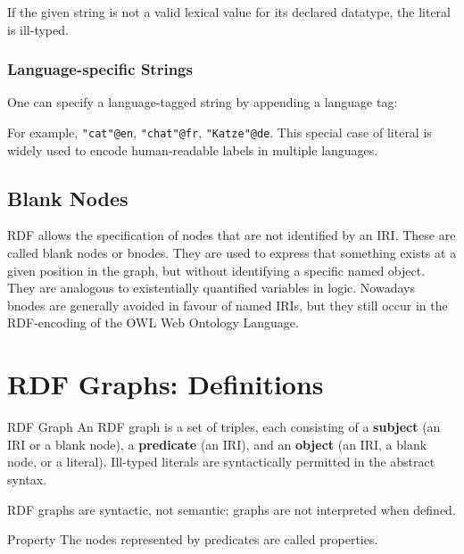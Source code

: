 If the given string is not a valid lexical value for its declared datatype, the literal is ill-typed.

\subsubsection{Language-specific Strings}
One can specify a language-tagged string by appending a language tag:
\begin{center}
\end{center}
For example, \texttt{"cat"@en}, \texttt{"chat"@fr}, \texttt{"Katze"@de}. 
This special case of literal is widely used to encode human-readable labels in multiple languages.

\subsection{Blank Nodes}
RDF allows the specification of nodes that are not identified by an IRI. These are called blank nodes or bnodes. They are used to express that something exists at a given position in the graph, but without identifying a specific named object. They are analogous to existentially quantified variables in logic. Nowadays bnodes are generally avoided in favour of named IRIs, but they still occur in the RDF-encoding of the OWL Web Ontology Language.

\section{RDF Graphs: Definitions}
\begin{definition}{RDF Graph}
    An RDF graph is a set of triples, each consisting of a \textbf{subject} (an IRI or a blank node), a \textbf{predicate} (an IRI), and an \textbf{object} (an IRI, a blank node, or a literal). Ill-typed literals are syntactically permitted in the abstract syntax.
\end{definition}

RDF graphs are syntactic, not semantic: graphs are not interpreted when defined. 

\begin{definition}{Property}
    The nodes represented by predicates are called properties.
\end{definition}

